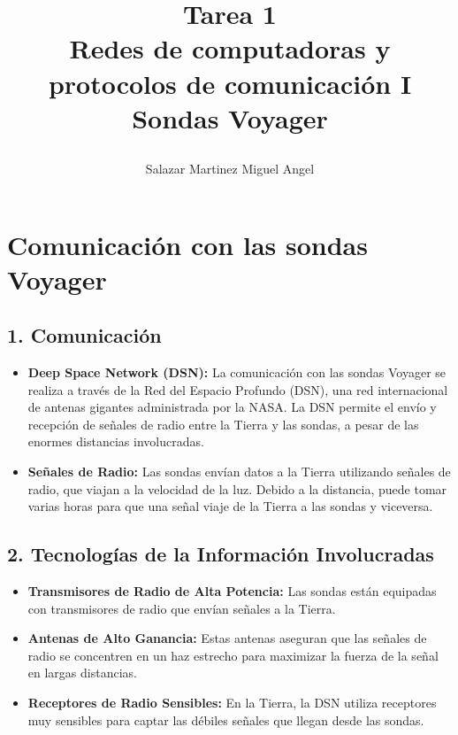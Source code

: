 \documentclass[12pt]{report}
\title{
	\begin{center}
		Tarea 1\\
		Redes de computadoras y protocolos de comunicación I
		\newline
		Sondas Voyager
	\end{center}
}
\author{Salazar Martinez Miguel Angel}
\begin{document}
	\renewcommand{\arraystretch}{1.3}
	
	\maketitle

\section*{Comunicación con las sondas Voyager}

\subsection*{1. Comunicación}
\begin{itemize}
	\item \textbf{Deep Space Network (DSN):} La comunicación con las sondas Voyager se realiza a través de la Red del Espacio Profundo (DSN), una red internacional de antenas gigantes administrada por la NASA. La DSN permite el envío y recepción de señales de radio entre la Tierra y las sondas, a pesar de las enormes distancias involucradas.
	\item \textbf{Señales de Radio:} Las sondas envían datos a la Tierra utilizando señales de radio, que viajan a la velocidad de la luz. Debido a la distancia, puede tomar varias horas para que una señal viaje de la Tierra a las sondas y viceversa.
\end{itemize}

\subsection*{2. Tecnologías de la Información Involucradas}
\begin{itemize}
	\item \textbf{Transmisores de Radio de Alta Potencia:} Las sondas están equipadas con transmisores de radio que envían señales a la Tierra.
	\item \textbf{Antenas de Alto Ganancia:} Estas antenas aseguran que las señales de radio se concentren en un haz estrecho para maximizar la fuerza de la señal en largas distancias.
	\item \textbf{Receptores de Radio Sensibles:} En la Tierra, la DSN utiliza receptores muy sensibles para captar las débiles señales que llegan desde las sondas.
\end{itemize}
\end{document}
